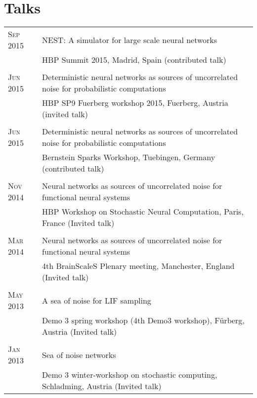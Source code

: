 \documentclass[a4paper,10pt]{article}
\begin{document}
\section{Talks}
\begin{tabular}{>{\hfill}p{1.6cm}|p{}}
  \textsc{Sep} 2015 & NEST: A simulator for large scale neural networks\\
  & \footnotesize HBP Summit 2015, Madrid, Spain (contributed talk)\\
  \multicolumn{2}{c}{} \\
  \textsc{Jun} 2015 & Deterministic neural networks as sources of uncorrelated noise for probabilistic computations\\
  & \footnotesize HBP SP9 Fuerberg workshop 2015, Fuerberg, Austria (invited talk)\\
  \multicolumn{2}{c}{} \\
  \textsc{Jun} 2015 & Deterministic neural networks as sources of uncorrelated noise for probabilistic computations \\
  & \footnotesize Bernstein Sparks Workshop, Tuebingen, Germany (contributed talk)\\
  \multicolumn{2}{c}{} \\
  \textsc{Nov} 2014 & Neural networks as sources of uncorrelated noise for functional neural systems \\
  & \footnotesize HBP Workshop on Stochastic Neural Computation, Paris, France (Invited talk)\\
  \multicolumn{2}{c}{} \\
  \textsc{Mar} 2014 & Neural networks as sources of uncorrelated noise for functional neural systems \\
  & \footnotesize 4th BrainScaleS Plenary meeting, Manchester, England  (Invited talk)\\
  \multicolumn{2}{c}{} \\
  \textsc{May} 2013 & A sea of noise for LIF sampling \\
  & \footnotesize Demo 3 spring workshop (4th Demo3 workshop), F\"urberg, Austria  (Invited talk)\\
  \multicolumn{2}{c}{} \\
  \textsc{Jan} 2013 & Sea of noise networks \\
  & \footnotesize Demo 3 winter-workshop on stochastic computing, Schladming, Austria (Invited talk)\\
\end{tabular}
\end{document}
